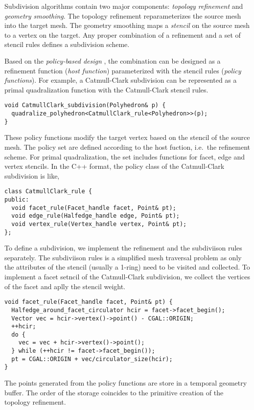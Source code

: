 Subdivision algorithms contain two major
components: \emph{topology refinement} and \emph{geometry smoothing}.
The topology refinement reparameterizes the source mesh into the target 
mesh. The geometry smoothing maps a \emph{stencil} on the source mesh
to a vertex on the target. Any proper combination of a refinement
and a set of stencil rules defines a subdivision scheme.

Based on the \emph{policy-based design} \cite{a-rotm-02}, 
the combination can be designed as a refinement function 
(\emph{host function}) parameterized with the stencil rules
(\emph{policy functions}). For example, a Catmull-Clark subdivision
can be represented as a primal quadralization function with the 
Catmull-Clark stencil rules.
\begin{lstlisting}
void CatmullClark_subdivision(Polyhedron& p) {
  quadralize_polyhedron<CatmullClark_rule<Polyhedron>>(p);
}
\end{lstlisting}
These policy functions modify the target vertex based on the 
stencil of the source mesh. The policy set are defined according
to the host fuction, i.e.\ the refinement scheme. For primal 
quadralization, the set includes functions for 
facet, edge and vertex stencils. In the C++ format, the 
policy class of the Catmull-Clark subdivision is like,
\begin{lstlisting}
class CatmullClark_rule {
public:
  void facet_rule(Facet_handle facet, Point& pt);
  void edge_rule(Halfedge_handle edge, Point& pt);
  void vertex_rule(Vertex_handle vertex, Point& pt);
};
\end{lstlisting}

To define a subdivision, we implement the refinement 
and the subdiviison rules separately.
The subdiviison rules is a simplified mesh traversal problem as
only the attributes of the stencil (usually a 1-ring) need to be  
visited and collected. To implement a facet setncil of the 
Catmull-Clark subdivision, we collect the vertices of the
facet and aplly the stencil weight.
\begin{lstlisting}
void facet_rule(Facet_handle facet, Point& pt) {
  Halfedge_around_facet_circulator hcir = facet->facet_begin();
  Vector vec = hcir->vertex()->point() - CGAL::ORIGIN;
  ++hcir;
  do {
    vec = vec + hcir->vertex()->point();
  } while (++hcir != facet->facet_begin());
  pt = CGAL::ORIGIN + vec/circulator_size(hcir);
}
\end{lstlisting}
The points generated from the policy functions are store in a 
temporal geometry buffer. The order of the storage  
coincides to the primitive creation of the 
topology refinement.

